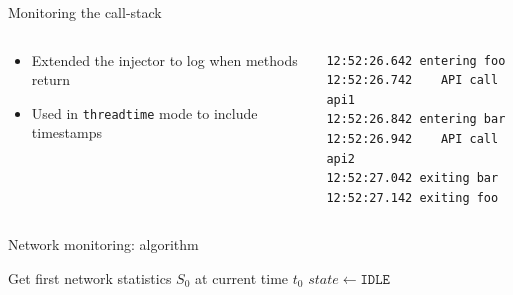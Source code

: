 \begin{frame}[fragile]{Monitoring the call-stack}
\begin{columns}
\begin{column}{0.4\textwidth}
\begin{itemize}
\item Extended the injector to \alert{log when methods return}
\item Used \logcat{} in \texttt{threadtime} mode to \alert{include timestamps}
\end{itemize}
\end{column}
\begin{column}{0.6\textwidth}
\begin{lstlisting}
12:52:26.642 entering foo
12:52:26.742 	API call api1
12:52:26.842 entering bar
12:52:26.942 	API call api2
12:52:27.042 exiting bar
12:52:27.142 exiting foo
\end{lstlisting}
\end{column}
\end{columns}
\end{frame}
%
%
\begin{frame}{Network monitoring: algorithm}
\begin{small}
\begin{algorithm}[H]
Get first network statistics $S_0$ at current time $t_0$\;
$state \leftarrow \texttt{IDLE}$\;
\end{algorithm}
\end{small}
\end{frame}
